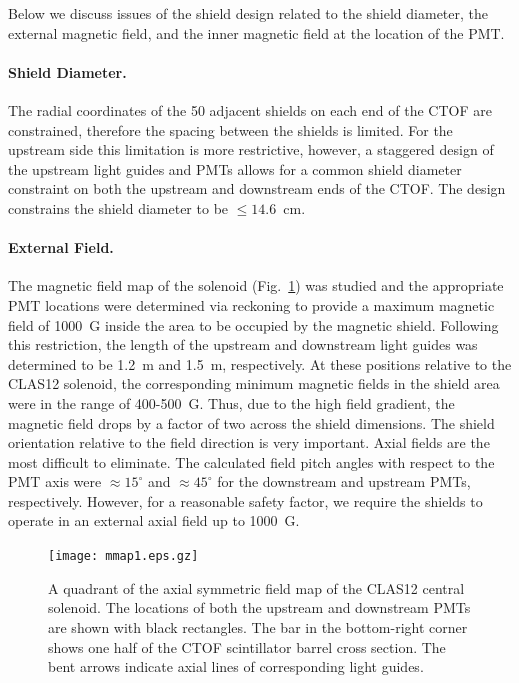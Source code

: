 \documentclass[12pt]{article}
\begin{document}
Below we discuss issues of the shield design related to the shield diameter, the
external magnetic field, and the inner magnetic field at the location of the PMT.

\paragraph{Shield Diameter.}
The radial coordinates of the 50 adjacent shields on each end of the CTOF are 
constrained, therefore the spacing between the shields is limited. For the upstream 
side this limitation is more restrictive, however, a staggered design of the upstream 
light guides and PMTs allows for a common shield diameter constraint on both the
upstream and downstream ends of the CTOF. The design constrains the shield diameter
to be $\leq14.6$~cm.

\paragraph{External Field.}
The magnetic field map of the solenoid (Fig.~\ref{fig:mmap}) was studied and the 
appropriate PMT locations were determined via reckoning to provide a maximum  
magnetic field of 1000~G inside the area to be occupied by the magnetic shield. 
Following this restriction, the length of the upstream and downstream light guides
was determined to be 1.2~m and 1.5~m, respectively. At these positions relative to
the CLAS12 solenoid, the corresponding minimum magnetic fields in the shield area 
were in the range of 400-500~G. Thus, due to the high field gradient, the magnetic 
field drops by a factor of two across the shield dimensions. The shield orientation 
relative to the field direction is very important. Axial fields are the most 
difficult to eliminate. The calculated field pitch angles with respect to the PMT 
axis were $\approx15^\circ$ and $\approx45^\circ$ for the downstream and upstream PMTs, 
respectively. However, for a reasonable safety factor, we require the shields to 
operate in an external axial field up to 1000~G.

\begin{figure}[htbp]
\centering
\texttt{[image: mmap1.eps.gz]}
\caption{A quadrant of the axial symmetric field map of the CLAS12 central 
solenoid. The locations of both the upstream and downstream PMTs are shown with 
black rectangles. The bar in the bottom-right corner shows one half of the CTOF 
scintillator barrel cross section. The bent arrows indicate axial lines of 
corresponding light guides.}
\label{fig:mmap}
\end{figure}
\end{document}
